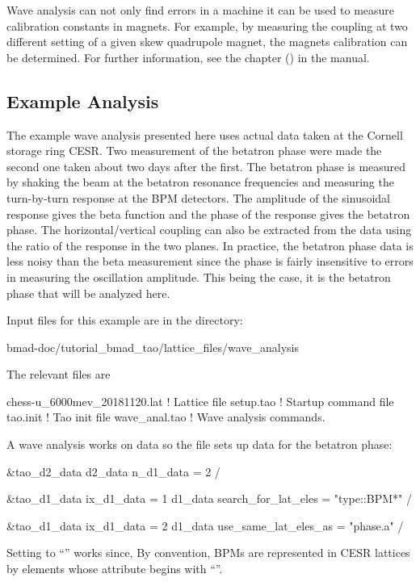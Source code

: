 \documentclass{hitec}     %
\begin{document}
Wave analysis can not only find errors in a machine it can be used to measure calibration constants
in magnets.  For example, by measuring the coupling at two different setting of a given skew
quadrupole magnet, the magnets calibration can be determined. For further information, see the
 chapter () in the \tao manual.

\subsection{Example Analysis}

The example wave analysis presented here uses actual data taken at the Cornell storage ring CESR.
Two measurement of the betatron phase were made the second one taken about two days after the first. 
The betatron phase is measured by shaking the beam at the betatron resonance frequencies and
measuring the turn-by-turn response at the BPM detectors\cite{b:phase.coupling.meas}. The amplitude
of the sinusoidal response gives the beta function and the phase of the response gives the betatron
phase. The horizontal/vertical coupling can also be extracted from the data using the ratio of the
response in the two planes. In practice, the betatron phase data is less noisy than the beta
measurement since the phase is fairly insensitive to errors in measuring the oscillation
amplitude. This being the case, it is the betatron phase that will be analyzed here.

Input files for this example are in the directory:
\begin{code}
bmad-doc/tutorial_bmad_tao/lattice_files/wave_analysis
\end{code}
The relevant files are 
\begin{code}
chess-u_6000mev_20181120.lat    ! Lattice file
setup.tao                       ! Startup command file
tao.init                        ! Tao init file
wave_anal.tao                   ! Wave analysis commands.
\end{code}

A wave analysis works on data so the  file sets up data for the betatron phase:
\begin{code}
&tao_d2_data
  d2_data%
  n_d1_data = 2
/

&tao_d1_data
  ix_d1_data = 1
  d1_data%
  search_for_lat_eles = "type::BPM*"
/

&tao_d1_data
  ix_d1_data = 2
  d1_data%
  use_same_lat_eles_as = "phase.a"
/
\end{code}
Setting  to ``'' works since, By convention, BPMs are
represented in CESR lattices by  elements whose  attribute begins with
``''.
\end{document}

